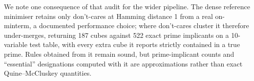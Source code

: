 We note one consequence of that audit for the wider pipeline.  The dense
reference minimiser retains only don't-cares at Hamming distance 1 from a real
on-minterm, a documented performance choice; where don't-cares cluster it
therefore under-merges, returning 187 cubes against 522 exact prime implicants
on a 10-variable test table, with every extra cube it reports strictly
contained in a true prime.  Rules obtained from it remain sound, but
prime-implicant counts and ``essential'' designations computed with it are
approximations rather than exact Quine--McCluskey quantities.
